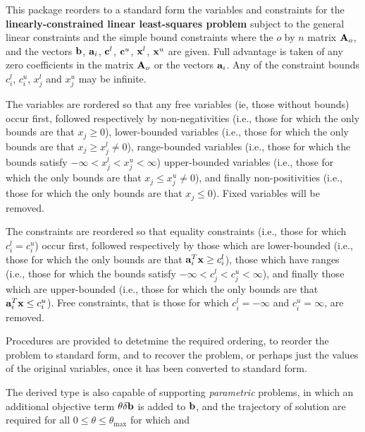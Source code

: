 \documentclass{galahad}
\begin{document}
\galheader


\galsummary
This package reorders to a standard form the variables and constraints
for the {\bf linearly-constrained linear least-squares problem}
subject to the general linear constraints
and the simple bound constraints
where the $o$ by $n$ matrix ${\mathbf{A}}_o$, and the
vectors ${\mathbf{b}}$, ${\mathbf{a}}_{i}$, ${\mathbf{c}}^{l}$, ${\mathbf{c}}^{u}$, ${\mathbf{x}}^{l}$,
${\mathbf{x}}^{u}$ are given.
Full advantage is taken of any zero coefficients in the matrix ${\mathbf{A}}_o$ or the
vectors ${\mathbf{a}}_{i}$.
Any of the constraint bounds $c_{i}^{l}$, $c_{i}^{u}$,
$x_{j}^{l}$ and $x_{j}^{u}$ may be infinite.

The variables are rordered so that any
free variables (ie, those without bounds) occur first, followed
respectively by
non-negativities (i.e., those for which the only
bounds are that $x_j \geq 0$),
lower-bounded variables (i.e., those for which the only
bounds are that $x_j \geq x_j^l \neq 0$),
range-bounded variables (i.e., those for which the
bounds satisfy $- \infty < x_j^l < x_j^u < \infty$)
upper-bounded variables (i.e., those for which the only
bounds are that $x_j \leq x_j^u \neq 0$), and finally
non-positivities (i.e., those for which the only
bounds are that $x_j \leq 0$).
Fixed variables will be removed.

The constraints are reordered so that equality constraints (i.e., those
for which $c_i^l = c_i^u$) occur first, followed
respectively by those
which are lower-bounded (i.e., those for which the only
bounds are that ${\mathbf{a}}_i^T {\mathbf{x}} \geq c_i^l$),
those which have ranges (i.e., those for which the
bounds satisfy
$- \infty < c_j^l < c_j^u < \infty$),
and finally those which are upper-bounded (i.e., those for which the only
bounds are that ${\mathbf{a}}_i^T {\mathbf{x}} \leq c_i^u$).
Free constraints, that is those for which
$c_i^l = - \infty$ and $c_i^u = \infty$, are removed.

Procedures are provided to detetmine the required ordering, to
reorder the problem to standard form, and
to recover the problem, or perhaps just the values of
the original variables, once it has been converted to standard form.

The derived type is also capable of supporting {\em parametric}
problems, in which an additional objective
term $\theta \delta {\mathbf{b}}$ is added to ${\mathbf{b}}$, and the trajectory of
solution are required for all $0 \leq \theta \leq \theta_{\max}$
for which
and
\end{document}
